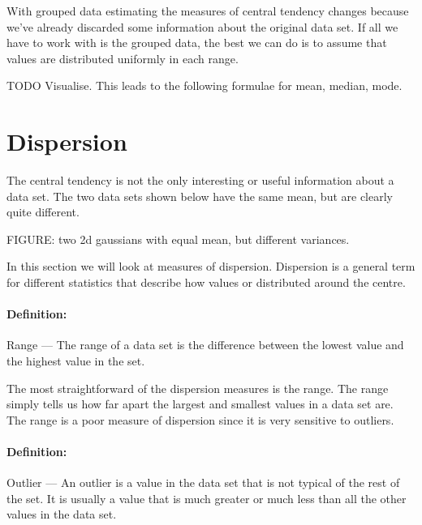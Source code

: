 \documentclass[a4paper,11pt]{report}
\def\Definition#1#2{\paragraph{Definition:} #1 --- #2}
\begin{document}
With grouped data estimating the measures of central tendency changes
because we've already discarded some information about the original
data set. If all we have to work with is the grouped data, the best we
can do is to assume that values are distributed uniformly in each
range.

TODO Visualise. This leads to the following formulae for mean,
median, mode.

\section{Dispersion}
The central tendency is not the only interesting or useful information
about a data set. The two data sets shown below have the same mean,
but are clearly quite different.

\begin{center}
  FIGURE: two 2d gaussians with equal mean, but different variances.
\end{center}

In this section we will look at measures of dispersion. Dispersion is
a general term for different statistics that describe how values or
distributed around the centre.

\Definition{Range}{The range of a data set is the difference between
  the lowest value and the highest value in the set.}

The most straightforward of the dispersion measures is the range. The
range simply tells us how far apart the largest and smallest values in
a data set are. The range is a poor measure of dispersion since it is
very sensitive to outliers.

\Definition{Outlier}{An outlier is a value in the data set that is not
  typical of the rest of the set. It is usually a value that is much
  greater or much less than all the other values in the data set.}
\end{document}
